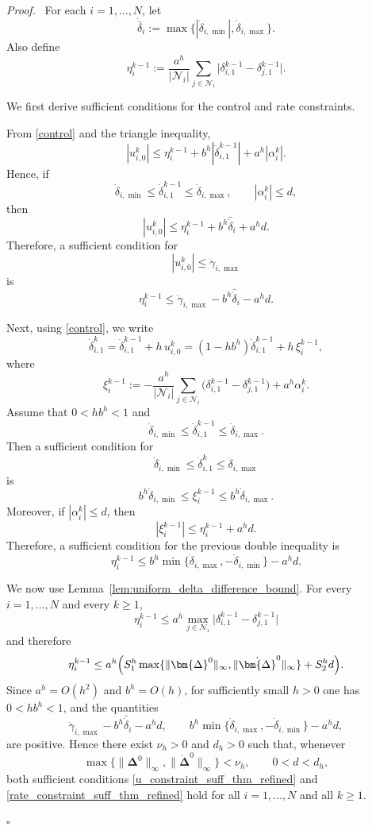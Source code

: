\documentclass[letterpaper,journal]{IEEEtran}
\newenvironment{proof}{\par\noindent\textit{Proof.}\ }{\hfill$\square$\par}
\begin{document}
\begin{proof}
For each \(i=1,\dots,N\), let
\[
\dot{\bar{\delta}}_i:=\max\{|\dot{\delta}_{i,\min}|,\dot{\delta}_{i,\max}\}.
\]
Also define
\[
\eta_i^{k-1}
:=
\frac{a^h}{|\mathcal N_i|}\sum_{j\in\mathcal N_i}
\big|\delta^{k-1}_{i,1}-\delta^{k-1}_{j,1}\big|.
\]

We first derive sufficient conditions for the control and rate constraints.

From \eqref{control} and the triangle inequality,
\[
|u_{i,0}^k|
\le
\eta_i^{k-1}
+
b^h|\dot\delta^{k-1}_{i,1}|
+
a^h|\alpha_i^{k}|.
\]
Hence, if
\[
\dot{\delta}_{i,\min}\le \dot{\delta}^{k-1}_{i,1}\le \dot{\delta}_{i,\max},
\qquad
|\alpha_i^{k}|\le d,
\]
then
\[
|u_{i,0}^k|
\le
\eta_i^{k-1}
+
b^h\bar{\dot\delta}_i
+
a^h d.
\]
Therefore, a sufficient condition for
\[
|u_{i,0}^k|\le \ddot{\gamma}_{i,\max}
\]
is
\begin{equation}\label{u_constraint_suff_thm_refined}
\eta_i^{k-1}
\le
\ddot{\gamma}_{i,\max}-b^h\bar{\dot\delta}_i-a^h d.
\end{equation}

Next, using \eqref{control}, we write
\[
\dot{\delta}^{k}_{i,1}
=
\dot{\delta}^{k-1}_{i,1}
+
h\,u^k_{i,0}
=
(1-hb^h)\dot{\delta}^{k-1}_{i,1}
+
h\,\xi_i^{k-1},
\]
where
\[
\xi_i^{k-1}
:=
-\frac{a^h}{|\mathcal N_i|}\sum_{j\in\mathcal N_i}
\big(\delta^{k-1}_{i,1}-\delta^{k-1}_{j,1}\big)
+
a^h\alpha_i^{k}.
\]
Assume that \(0<hb^h<1\) and
\[
\dot{\delta}_{i,\min}\le \dot{\delta}^{k-1}_{i,1}\le \dot{\delta}_{i,\max}.
\]
Then a sufficient condition for
\[
\dot{\delta}_{i,\min}\le \dot{\delta}^{k}_{i,1}\le \dot{\delta}_{i,\max}
\]
is
\[
b^h\dot{\delta}_{i,\min}
\le
\xi_i^{k-1}
\le
b^h\dot{\delta}_{i,\max}.
\]
Moreover, if \(|\alpha_i^{k}|\le d\), then
\[
|\xi_i^{k-1}|
\le
\eta_i^{k-1}+a^h d.
\]
Therefore, a sufficient condition for the previous double inequality is
\begin{equation}\label{rate_constraint_suff_thm_refined}
\eta_i^{k-1}
\le
b^h\min\{\dot{\delta}_{i,\max},-\dot{\delta}_{i,\min}\}-a^h d.
\end{equation}

We now use Lemma~\ref{lem:uniform_delta_difference_bound}. For every \(i=1,\dots,N\) and every \(k\ge 1\),
\[
\eta_i^{k-1}
\le
a^h
\max_{j\in\mathcal N_i}
\big|\delta^{k-1}_{i,1}-\delta^{k-1}_{j,1}\big|
\]
and therefore
\[
\eta_i^{k-1}
\le
a^h\Bigl(
S_1^h\max\{\|\bm{\Delta}^0\|_\infty,\|\dot{\bm{\Delta}}^0\|_\infty\}
+
S_2^h d
\Bigr).
\]
Since \(a^h=O(h^2)\) and \(b^h=O(h)\), for sufficiently small \(h>0\) one has \(0<hb^h<1\), and the quantities
\[
\ddot{\gamma}_{i,\max}-b^h\bar{\dot\delta}_i-a^h d,
\qquad
b^h\min\{\dot{\delta}_{i,\max},-\dot{\delta}_{i,\min}\}-a^h d,
\]
are positive. Hence there exist \(\nu_h>0\) and \(d_h>0\) such that, whenever
\[
\max\{\|\bm{\Delta}^0\|_\infty,\|\dot{\bm{\Delta}}^0\|_\infty\}<\nu_h,
\qquad
0<d<d_h,
\]
both sufficient conditions \eqref{u_constraint_suff_thm_refined} and \eqref{rate_constraint_suff_thm_refined} hold for all \(i=1,\dots,N\) and all \(k\ge 1\).


\end{proof}
\end{document}
